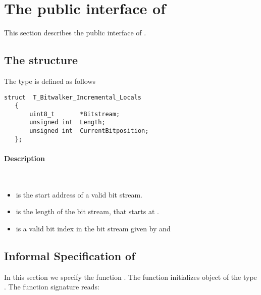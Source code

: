 

\section{The public interface of \bitwalker}
\label{sec:bitwalker-public}

This section describes the public interface of \bitwalker.

\subsection{The structure \bitwalkertype}


The type \bitwalkertype is defined as follows\\[1em]

\begin{lstlisting}[style=acsl-block]
   struct  T_Bitwalker_Incremental_Locals
   {
       uint8_t       *Bitstream;
       unsigned int  Length;
       unsigned int  CurrentBitposition;
   };
\end{lstlisting}


\paragraph{Description}~

\begin{itemize}

   \item {} is  the start address of a valid bit stream.
   \item {} is the length of the bit stream, that starts at .
   \item {} is a valid bit index in
              the bit stream given by  and 

\end{itemize}


\clearpage

\subsection{Informal Specification of }

In this section we specify the function \init.
 The function  initializes object of the type \bitwalkertype.
The function signature reads:\\[1em]


